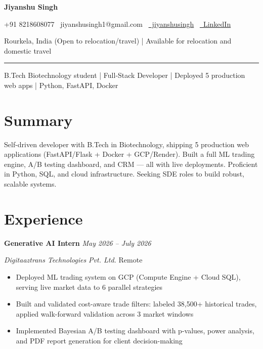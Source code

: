 \documentclass[11pt,a4paper]{article}
\begin{document}
\begin{center}
    {\LARGE \bfseries Jiyanshu Singh}
    
    \vspace{4pt}
    {\small +91 8218608077 \textbullet\ jiyanshusingh1@gmail.com \textbullet\ \href{https://github.com/jiyanshusingh}{\faGithub\ jiyanshusingh} \textbullet\ \href{https://linkedin.com/in/jiyanshusingh}{\faLinkedin\ LinkedIn}}
    
    \vspace{2pt}
    {\footnotesize Rourkela, India (Open to relocation/travel) | Available for relocation and domestic travel}
    
    \rule{\textwidth}{0.4pt}
\end{center}

\begin{center}
    {\large \color{midblue} B.Tech Biotechnology student | Full-Stack Developer | Deployed 5 production web apps | Python, FastAPI, Docker}
\end{center}

\vspace{6pt}
\section*{Summary}
Self-driven developer with B.Tech in Biotechnology, shipping 5 production web applications (FastAPI/Flask + Docker + GCP/Render). Built a full ML trading engine, A/B testing dashboard, and CRM — all with live deployments. Proficient in Python, SQL, and cloud infrastructure. Seeking SDE roles to build robust, scalable systems.

\section*{Experience}
\noindent\textbf{Generative AI Intern} \hfill \textit{May 2026 – July 2026}

\noindent\textit{Digitaaztrans Technologies Pvt. Ltd.} \hfill Remote
\begin{itemize}
    \item Deployed ML trading system on GCP (Compute Engine + Cloud SQL), serving live market data to 6 parallel strategies
    \item Built and validated cost-aware trade filters: labeled 38,500+ historical trades, applied walk-forward validation across 3 market windows
    \item Implemented Bayesian A/B testing dashboard with p-values, power analysis, and PDF report generation for client decision-making
\end{itemize}
\end{document}
